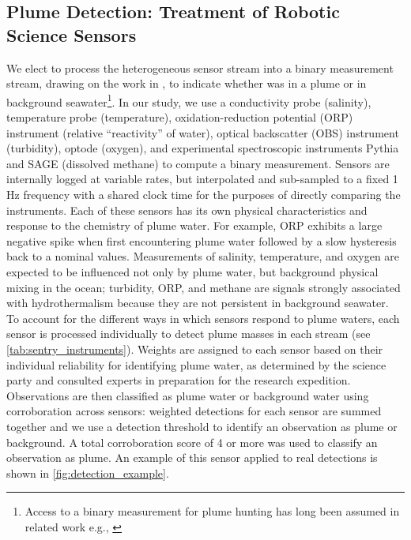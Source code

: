\subsection{Plume Detection: Treatment of Robotic Science Sensors}
\label{sec:sensor_models}
We elect to process the heterogeneous sensor stream into a binary measurement stream, drawing on the work in \autocite{jakuba2007stochastic}, to indicate whether \Sentry was in a plume or in background seawater\footnote{Access to a binary measurement for plume hunting has long been assumed in related work e.g.,  \autocite{tian2014behavior,saigol2009information}}. In our study, we use a conductivity probe (salinity), temperature probe (temperature), oxidation-reduction potential (ORP) instrument (relative ``reactivity'' of water), optical backscatter (OBS) instrument (turbidity), optode (oxygen), and experimental spectroscopic instruments Pythia \autocite{michel2022gas,Harb:12} and SAGE \autocite{kapit2021dissolved,kapit2021measurement} (dissolved methane) to compute a binary measurement. Sensors are internally logged at variable rates, but interpolated and sub-sampled to a fixed 1 Hz frequency with a shared clock time for the purposes of directly comparing the instruments. Each of these sensors has its own physical characteristics and response to the chemistry of plume water. For example, ORP exhibits a large negative spike when first encountering plume water followed by a slow hysteresis back to a nominal values. Measurements of salinity, temperature, and oxygen are expected to be influenced not only by plume water, but background physical mixing in the ocean; turbidity, ORP, and methane are signals strongly associated with hydrothermalism because they are not persistent in background seawater. To account for the different ways in which sensors respond to plume waters, each sensor is processed individually to detect plume masses in each stream (see \cref{tab:sentry_instruments}). Weights are assigned to each sensor based on their individual reliability for identifying plume water, as determined by the science party and consulted experts in preparation for the research expedition. Observations are then classified as plume water or background water using corroboration across sensors: weighted detections for each sensor are summed together and we use a detection threshold to identify an observation as plume or background. A total corroboration score of 4 or more was used to classify an observation as plume. An example of this sensor applied to real \Sentry detections is shown in \cref{fig:detection_example}.


